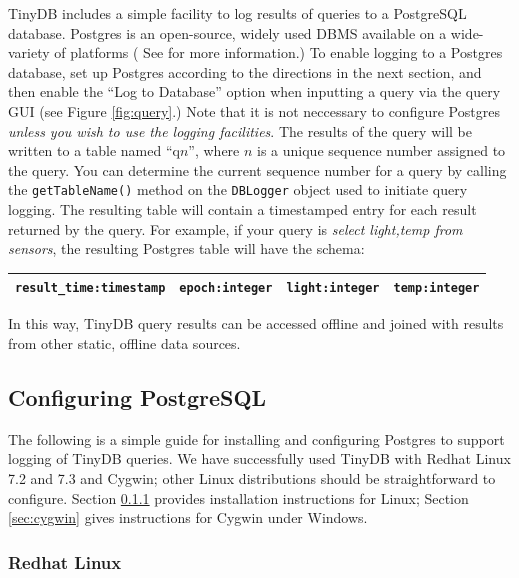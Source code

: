\documentclass[11pt]{article}
\begin{document}
TinyDB includes a simple facility to log results of queries to a
PostgreSQL database.  Postgres is an open-source,
widely used DBMS available on a wide-variety of platforms ( See
 for more
information.)  To enable logging to a Postgres database, set up
Postgres according to the directions in the next section, and then
enable the ``Log to Database'' option when inputting a query via the
query GUI (see Figure \ref{fig:query}.) Note that it is not neccessary
to configure Postgres {\it unless you wish to use the logging
facilities}.  The results of the query will be written to a table
named ``q$n$'', where $n$ is a unique sequence number assigned to the
query.  You can determine the current sequence number for a query by
calling the {\tt getTableName()} method on the {\tt DBLogger} object
used to initiate query logging.  The resulting table will contain a
timestamped entry for each result returned by the query.  For example,
if your query is {\it select light,temp from sensors}, the resulting
Postgres table will have the schema:

\begin{tabular}{|c|c|c|c|}
\hline
{\tt result\_time:timestamp} & {\tt epoch:integer}&{\tt light:integer}&{\tt temp:integer} \\
\hline
\end{tabular}

\noindent In this way, TinyDB query results can be accessed offline and joined with results from other static, offline data sources.

\subsection{Configuring PostgreSQL}\label{sec:postgres-config}
The following is a simple guide for installing and configuring
Postgres  to support logging of TinyDB queries.  We
have successfully used TinyDB with Redhat Linux 7.2 and 7.3 and
Cygwin; other Linux distributions should be straightforward to
configure.  Section \ref{sec:redhat} provides installation
instructions for Linux;  Section \ref{sec:cygwin} gives
instructions for Cygwin under Windows.


\subsubsection{Redhat Linux}\label{sec:redhat}
\end{document}
